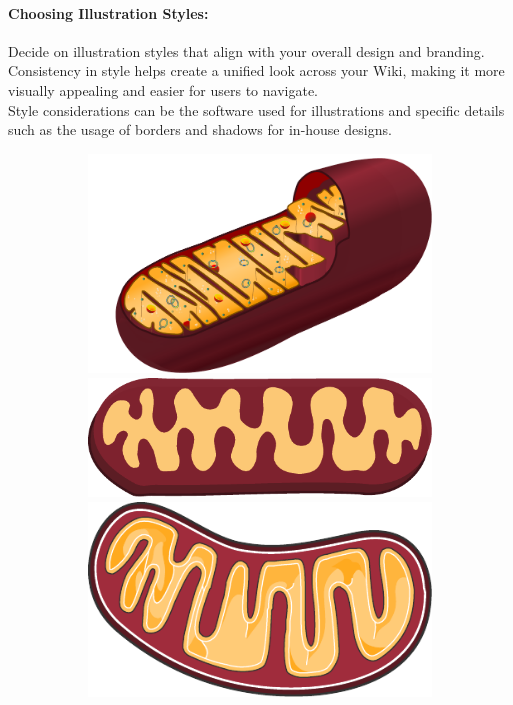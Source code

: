 \paragraph{Choosing Illustration Styles:} Decide on illustration styles that align with your overall design and branding.
Consistency in style helps create a unified look across your Wiki, making it more visually appealing and easier for users to navigate. \\
Style considerations can be the software used for illustrations and specific details such as the usage of borders and shadows for in-house designs.
\begin{figure}[H]
    \centering
    \begin{subfigure}[t]{0.2\linewidth}
        \includegraphics[width=\textwidth]{chapters/images/animal_mitochondrion}
        \includegraphics[width=\textwidth]{chapters/images/mitochondrium-rod}
        \includegraphics[width=\textwidth]{chapters/images/mitochondrium-servier}

\end{subfigure}
\end{figure}
